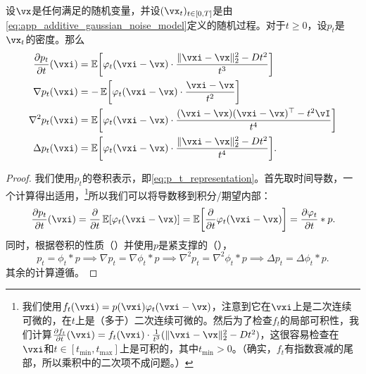 \documentclass[../../book-main_zh.tex]{subfiles}
\begin{document}
\begin{proposition}\label{prop:p_t_derivatives}
    设\(\vx\)是任何满足的随机变量，并设\((\vx_{t})_{t \in [0, T]}\)是由\eqref{eq:app_additive_gaussian_noise_model}定义的随机过程。对于\(t \geq 0\)，设\(p_{t}\)是\(\vx_{t}\)的密度。那么
    \begin{align}
        \pdv{p_{t}}{t}(\vxi)
        &= \Ex\rs{\phi_{t}(\vxi - \vx)\cdot\frac{\norm{\vxi - \vx}_{2}^{2} - Dt^{2}}{t^{3}}} \\
        \nabla p_{t}(\vxi)
        &= -\Ex\rs{\phi_{t}(\vxi - \vx)\cdot\frac{\vxi - \vx}{t^{2}}} \\
        \nabla^{2}p_{t}(\vxi)
        &= \Ex\rs{\phi_{t}(\vxi - \vx)\cdot\frac{(\vxi - \vx)(\vxi - \vx)^{\top} - t^{2}\vI}{t^{4}}} \\ 
        \Delta p_{t}(\vxi)
        &= \Ex\rs{\phi_{t}(\vxi - \vx)\cdot\frac{\norm{\vxi - \vx}_{2}^{2} - Dt^{2}}{t^{4}}}.
    \end{align}
\end{proposition}
\begin{proof} 
    我们使用\(p_{t}\)的卷积表示，即\eqref{eq:p_t_representation}。首先取时间导数，一个计算得出适用，\footnote{我们使用\(f_{t}(\vxi) = p(\vxi) \phi_{t}(\vxi - \vx)\)，注意到它在\(\vxi\)上是二次连续可微的，在\(t\)上是（多于）二次连续可微的。然后为了检查\(f_{t}\)的局部可积性，我们计算\(\pdv{f_{t}}{t}(\vxi) = f_{t}(\vxi)\cdot \frac{1}{t^{3}}(\norm{\vxi - \vx}_{2}^{2} - Dt^{2})\)，这很容易检查在\(\vxi\)和\(t \in [t_{\min}, t_{\max}]\)上是可积的，其中\(t_{\min} > 0\)。（确实，\(f_{t}\)有指数衰减的尾部，所以乘积中的二次项不成问题。）}所以我们可以将导数移到积分/期望内部：
    \begin{equation}
        \pdv{p_{t}}{t}(\vxi) = \pdv*{\Ex[\phi_{t}(\vxi - \vx)]}{t} = \Ex\rs{\pdv*{\phi_{t}(\vxi - \vx)}{t}} = \pdv{\phi_{t}}{t} * p.
    \end{equation}
    同时，根据卷积的性质（）并使用\(p\)是紧支撑的（），
    \begin{equation}
        p_{t} = \phi_{t} * p \implies \nabla p_{t} = \nabla \phi_{t} * p \implies \nabla^{2}p_{t} = \nabla^{2}\phi_{t} * p \implies \Delta p_{t} = \Delta \phi_{t} * p.
    \end{equation}
    其余的计算遵循。
\end{proof}
\end{document}
